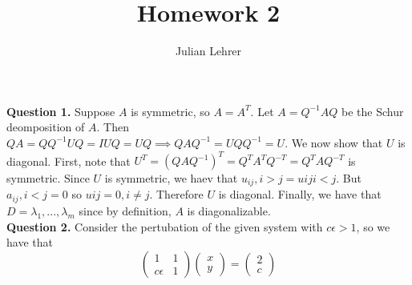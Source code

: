 \documentclass{article}
\title{Homework 2}
\date{}
\author{Julian Lehrer}
\begin{document}
\maketitle
\textbf{Question 1.} Suppose $A$ is symmetric, so $A=A^{T}$. Let $A=Q^{-1}AQ$ be the Schur deomposition of $A$. Then $QA=QQ^{-1}UQ = IUQ = UQ \implies QAQ^{-1}=UQQ^{-1}=U$. We now show that $U$ is diagonal. First, note that $U^T = (QAQ^{-1})^T = Q^TA^TQ^{-T} = Q^T A Q^{-T}$ is symmetric. Since $U$ is symmetric, we haev that $u_{ij}, i > j = u{ij} i < j$. But $a_{ij}, i < j = 0$ so $u{ij} = 0, i \neq j$. Therefore $U$ is diagonal. Finally, we have that $D={\lambda_1,...,\lambda_m}$ since by definition, $A$ is diagonalizable. \\

\textbf{Question 2.} Consider the pertubation of the given system with $c\epsilon > 1$, so we have that 
\begin{equation*}
    \begin{pmatrix}
        1 & 1\\
        c\epsilon & 1
    \end{pmatrix}\begin{pmatrix}
        x\\y
    \end{pmatrix}=
    \begin{pmatrix}
        2\\c
    \end{pmatrix}
\end{equation*}
\end{document}
